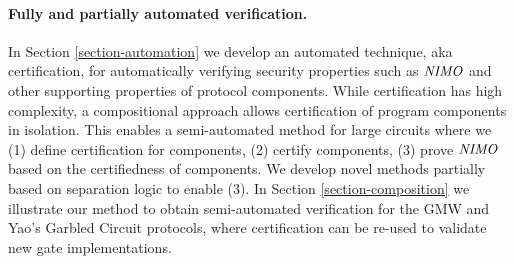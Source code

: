 \paragraph{Fully and partially automated verification.} In Section
\ref{section-automation} we develop an automated technique, aka
certification, for automatically verifying security properties such as
$\mathit{NIMO}$ and other supporting properties of protocol components.  While
certification has high complexity, a compositional approach allows
certification of program components in isolation.  This enables a
semi-automated method for large circuits where we (1) define
certification for components, (2) certify components, (3) prove
$\mathit{NIMO}$ based on the certifiedness of components. We develop novel
methods partially based on separation logic
\cite{barthe2019probabilistic} to enable (3).  In Section
\ref{section-composition} we illustrate our method to obtain
semi-automated verification for the GMW and Yao's Garbled
Circuit protocols, where certification can be re-used to validate new
gate implementations.
